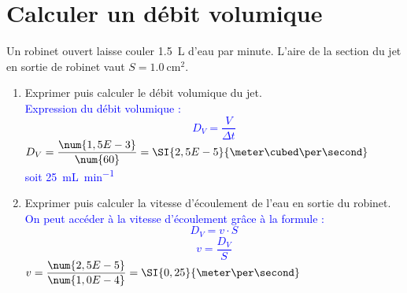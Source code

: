 \documentclass[a4paper,11pt,fleqn,usenames,dvipsnames]{article}%
\begin{document}
\section{Calculer un débit volumique}
Un robinet ouvert laisse couler \SI{1,5}{L} d'eau par minute. L'aire de la section du jet en sortie de robinet vaut $S=\SI{1,0}{\centi\meter\squared}$.
\begin{enumerate}
	\item Exprimer puis calculer le débit volumique du jet.\\
	\textcolor{blue}{Expression du débit volumique : $$D_V = \dfrac{V}{\Delta t}$$
	 $ D_V = \dfrac{\num{1,5E-3}}{\num{60}} = \SI{2,5E-5}{\meter\cubed\per\second}$\\
	soit \SI{25}{\milli\liter\per\minute}
	}
	\item Exprimer puis calculer la vitesse d'écoulement de l'eau en sortie du robinet.\\
	\textcolor{blue}{On peut accéder à la vitesse d'écoulement grâce à la formule : $$D_V = v \cdot S$$
	$$v=\dfrac{D_V}{S}$$
	 $v=\dfrac{\num{2,5E-5}}{\num{1,0E-4}}=\SI{0,25}{\meter\per\second}$	
	}
\end{enumerate}
\end{document}
